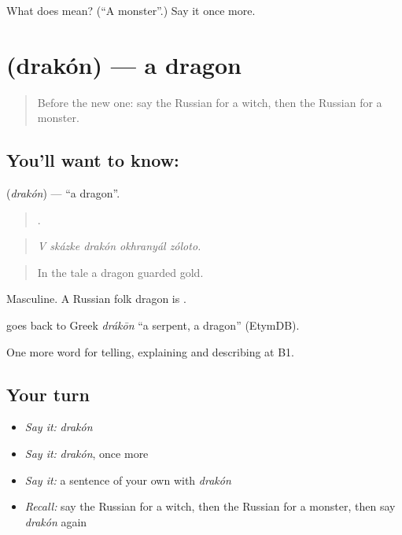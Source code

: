\begin{tcolorbox}[breakable,colback=teal!4,colframe=teal!35!black,title={Before you move on}]
What does  mean? (\textquotedblleft{}A monster\textquotedblright{}.) Say it once more.
\end{tcolorbox}
\section[\texorpdfstring{\ru{дракон} (drakón)}{дракон (drakón)}]{ (drakón) — a dragon}

\label{lesson:RU-C320-drakon}



\begin{quote}
Before the new one: say the Russian for a witch, then the Russian for a monster.
\end{quote}

\subsection*{You'll want to know: }
\textbf{} (\emph{drakón}) — \textquotedblleft{}a dragon\textquotedblright{}.

\begin{quote}
    .
\end{quote}

\begin{quote}
\emph{V skázke drakón okhranyál zóloto.}
\end{quote}

\begin{quote}
In the tale a dragon guarded gold.
\end{quote}

Masculine. A Russian folk dragon is \emph{}.

\begin{cousinweb}
\emph{} goes back to Greek \emph{drákōn} \textquotedblleft{}a serpent, a dragon\textquotedblright{} (EtymDB).
\end{cousinweb}

\begin{grammarlens}[title={What you've built}]
One more word for telling, explaining and describing at B1.
\end{grammarlens}

\subsection*{Your turn}
\begin{itemize}
\raggedright
  \item \emph{Say it:} \emph{drakón}
  \item \emph{Say it:} \emph{drakón}, once more
  \item \emph{Say it:} a sentence of your own with \emph{drakón}
  \item \emph{Recall:} say the Russian for a witch, then the Russian for a monster, then say \emph{drakón} again
\end{itemize}

